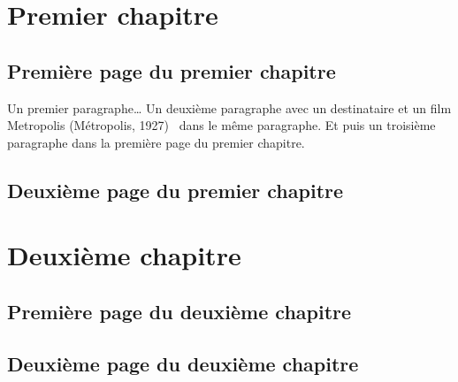 \chapter{Premier chapitre}
\section{Première page du premier chapitre}
Un premier paragraphe\ldots \newline
Un deuxième paragraphe avec un destinataire et un film Metropolis (Métropolis, 1927)~\cite{Metropolis} dans le même paragraphe.\newline
Et puis un troisième paragraphe dans la première page du premier chapitre.\newline
\section{Deuxième page du premier chapitre}
\chapter{Deuxième chapitre}
\section{Première page du deuxième chapitre}
\section{Deuxième page du deuxième chapitre}
